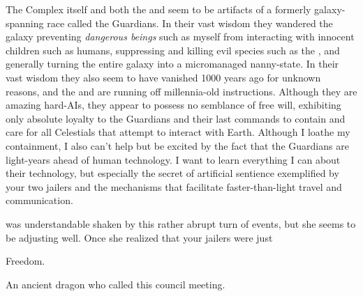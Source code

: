 \documentclass[char]{guardians}
\begin{document}
The Complex itself and both the \cCaretaker{} and \cWarden{} seem to be artifacts of a formerly galaxy-spanning race called the Guardians. In their vast wisdom they wandered the galaxy preventing \emph{dangerous beings} such as myself from interacting with innocent children such as humans, suppressing and killing evil species such as the \evilRace{}, and generally turning the entire galaxy into a micromanaged nanny-state. In their vast wisdom they also seem to have vanished 1000 years ago for unknown reasons, and the \cCaretaker{} and \cWarden{} are running off millennia-old instructions. Although they are amazing hard-AIs, they appear to possess no semblance of free will, exhibiting only absolute loyalty to the Guardians and their last commands to contain and care for all Celestials that attempt to interact with Earth. Although I loathe my containment, I also can't help but be excited by the fact that the Guardians are light-years ahead of human technology. I want to learn everything I can about their technology, but especially the secret of artificial sentience exemplified by your two jailers and the mechanisms that facilitate faster-than-light travel and communication.

\cKachiko{} was understandable shaken by this rather abrupt turn of events, but she seems to be adjusting well. Once she realized that your jailers were just 

\begin{itemz}[Goals]
  \item Freedom.
\end{itemz}


\begin{contacts}
  \contact{\cCaretaker{}} An ancient dragon who called this council meeting.
\end{contacts}
\end{document}
